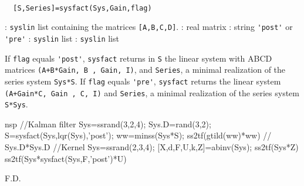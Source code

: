 \begin{mandesc}
   \\ %
\end{mandesc}
\begin{calling_sequence}
\begin{verbatim}
  [S,Series]=sysfact(Sys,Gain,flag)  
\end{verbatim}
\end{calling_sequence}
\begin{parameters}
  \begin{varlist}
    : \verb!syslin! list containing the matrices \verb![A,B,C,D]!.
    : real matrix
    : string \verb!'post'! or \verb!'pre'!
    : \verb!syslin! list
    : \verb!syslin! list
  \end{varlist}
\end{parameters}
\begin{mandescription}
  If \verb!flag! equals \verb!'post'!, \verb!sysfact! returns in \verb!S! the linear 
  system with ABCD matrices \verb!(A+B*Gain, B , Gain, I)!, and   \verb!Series!, 
  a minimal realization of the series system \verb!Sys*S!.
  If \verb!flag! equals \verb!'pre'!,  \verb!sysfact! returns  the linear system
  \verb!(A+Gain*C, Gain , C, I)! and \verb!Series!, a minimal realization of the 
  series system \verb!S*Sys!.
\end{mandescription}
\begin{examples}
  \begin{mintednsp}{nsp}
    //Kalman filter
    Sys=ssrand(3,2,4);
    Sys.D=rand(3,2);
    S=sysfact(Sys,lqr(Sys),'post');
    ww=minss(Sys*S);
    ss2tf(gtild(ww)*ww)
    // Sys.D*Sys.D
    //Kernel
    Sys=ssrand(2,3,4);
    [X,d,F,U,k,Z]=abinv(Sys);
    ss2tf(Sys*Z)
    ss2tf(Sys*sysfact(Sys,F,'post')*U)
  \end{mintednsp}
\end{examples}
\begin{manseealso}
     
\end{manseealso}
\begin{authors}
  F.D.  
\end{authors}
